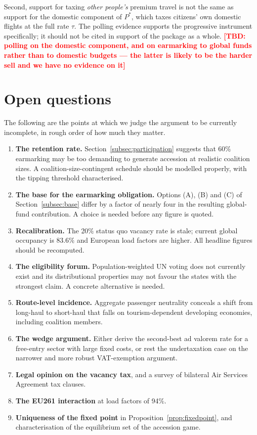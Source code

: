 \documentclass[11pt]{article}
\newcommand{\tbd}[1]{\textcolor{red}{\textbf{[TBD: #1]}}}
\begin{document}
Second, support for taxing \emph{other people's} premium travel is not the same
as support for the domestic component of $P^{*}$, which taxes citizens' own
domestic flights at the full rate $\tau$. The polling evidence supports the
progressive instrument specifically; it should not be cited in support of the
package as a whole. \tbd{polling on the domestic component, and on earmarking to
global funds rather than to domestic budgets --- the latter is likely to be the
harder sell and we have no evidence on it}

\section{Open questions}
\label{sec:open}

The following are the points at which we judge the argument to be currently
incomplete, in rough order of how much they matter.

\begin{enumerate}
  \item \textbf{The retention rate.} Section~\ref{subsec:participation} suggests
  that 60\% earmarking may be too demanding to generate accession at realistic
  coalition sizes. A coalition-size-contingent schedule should be modelled
  properly, with the tipping threshold characterised.
  \item \textbf{The base for the earmarking obligation.} Options (A), (B) and (C)
  of Section~\ref{subsec:base} differ by a factor of nearly four in the resulting
  global-fund contribution. A choice is needed before any figure is quoted.
  \item \textbf{Recalibration.} The 20\% status quo vacancy rate is stale;
  current global occupancy is 83.6\% and European load factors are higher. All
  headline figures should be recomputed.
  \item \textbf{The eligibility forum.} Population-weighted UN voting does not
  currently exist and its distributional properties may not favour the states
  with the strongest claim. A concrete alternative is needed.
  \item \textbf{Route-level incidence.} Aggregate passenger neutrality conceals
  a shift from long-haul to short-haul that falls on tourism-dependent
  developing economies, including coalition members.
  \item \textbf{The wedge argument.} Either derive the second-best ad valorem
  rate for a free-entry sector with large fixed costs, or rest the undertaxation
  case on the narrower and more robust VAT-exemption argument.
  \item \textbf{Legal opinion on the vacancy tax}, and a survey of bilateral Air
  Services Agreement tax clauses.
  \item \textbf{The EU261 interaction} at load factors of 94\%.
  \item \textbf{Uniqueness of the fixed point} in
  Proposition~\ref{prop:fixedpoint}, and characterisation of the equilibrium set
  of the accession game.
\end{enumerate}
\end{document}
